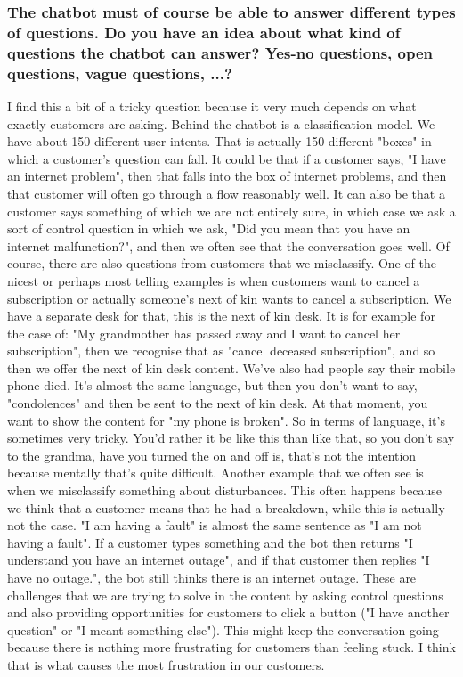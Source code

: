 \begin{appendices}
	\subsubsection{The chatbot must of course be able to answer different types of questions.
		Do you have an idea about what kind of questions the chatbot can answer?
		Yes-no questions, open questions, vague questions, ...?}
	
	I find this a bit of a tricky question because it very much depends on what exactly customers are asking. Behind the chatbot is a classification model. We have about 150 different user intents. That is actually 150 different "boxes" in which a customer's question can fall. It could be that if a customer says, "I have an internet problem", then that falls into the box of internet problems, and then that customer will often go through a flow reasonably well. It can also be that a customer says something of which we are not entirely sure, in which case we ask a sort of control question in which we ask, "Did you mean that you have an internet malfunction?", and then we often see that the conversation goes well. Of course, there are also questions from customers that we misclassify. One of the nicest or perhaps most telling examples is when customers want to cancel a subscription or actually someone's next of kin wants to cancel a subscription. We have a separate desk for that, this is the next of kin desk. It is for example for the case of: "My grandmother has passed away and I want to cancel her subscription", then we recognise that as "cancel deceased subscription", and so then we offer the next of kin desk content. We've also had people say their mobile phone died. It's almost the same language, but then you don't want to say, "condolences" and then be sent to the next of kin desk. At that moment, you want to show the content for "my phone is broken". So in terms of language, it's sometimes very tricky. You'd rather it be like this than like that, so you don't say to the grandma, have you turned the on and off is, that's not the intention because mentally that's quite difficult. Another example that we often see is when we misclassify something about disturbances. This often happens because we think that a customer means that he had a breakdown, while this is actually not the case. "I am having a fault" is almost the same sentence as "I am not having a fault". If a customer types something and the bot then returns "I understand you have an internet outage", and if that customer then replies "I have no outage.", the bot still thinks there is an internet outage. These are challenges that we are trying to solve in the content by asking control questions and also providing opportunities for customers to click a button ("I have another question" or "I meant something else"). This might keep the conversation going because there is nothing more frustrating for customers than feeling stuck. I think that is what causes the most frustration in our customers.
	

\end{appendices}
